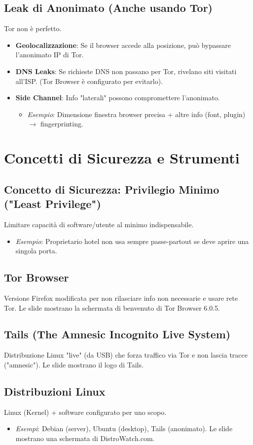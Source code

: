 \subsection{Leak di Anonimato (Anche usando Tor)}
Tor non è perfetto.
\begin{itemize}
    \item \textbf{Geolocalizzazione}: Se il browser accede alla posizione, può bypassare l'anonimato IP di Tor.
    \item \textbf{DNS Leaks}: Se richieste DNS non passano per Tor, rivelano siti visitati all'ISP. (Tor Browser è configurato per evitarlo).
    \item \textbf{Side Channel}: Info "laterali" possono compromettere l'anonimato.
        \begin{itemize}
            \item \textit{Esempio}: Dimensione finestra browser precisa + altre info (font, plugin) $\rightarrow$ fingerprinting.
        \end{itemize}
\end{itemize}

\section{Concetti di Sicurezza e Strumenti}

\subsection{Concetto di Sicurezza: Privilegio Minimo ("Least Privilege")}
Limitare capacità di software/utente al minimo indispensabile.
\begin{itemize}
    \item \textit{Esempio}: Proprietario hotel non usa sempre passe-partout se deve aprire una singola porta.
\end{itemize}

\subsection{Tor Browser}
Versione Firefox modificata per non rilasciare info non necessarie e usare rete Tor. Le slide mostrano la schermata di benvenuto di Tor Browser 6.0.5.

\subsection{Tails (The Amnesic Incognito Live System)}
Distribuzione Linux "live" (da USB) che forza traffico via Tor e non lascia tracce ("amnesic"). Le slide mostrano il logo di Tails.

\subsection{Distribuzioni Linux}
Linux (Kernel) + software configurato per uno scopo.
\begin{itemize}
    \item \textit{Esempi}: Debian (server), Ubuntu (desktop), Tails (anonimato). Le slide mostrano una schermata di DistroWatch.com.
\end{itemize}

